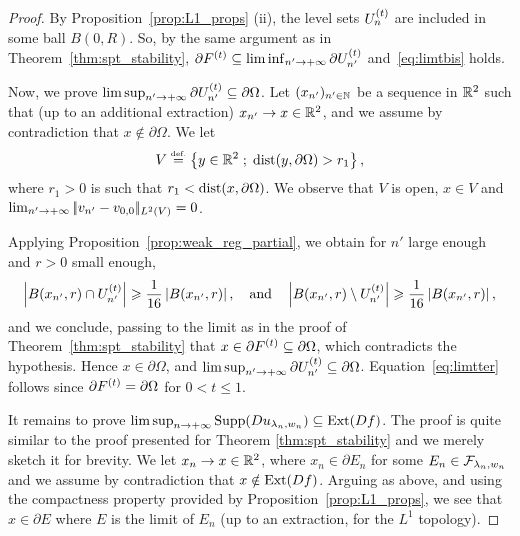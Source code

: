 \begin{proof}
  
  By Proposition~\ref{prop:L1_props} (ii), the level sets $U_n^{(t)}$ are included in some ball $B(0,R)$. So, by the same argument as in Theorem~\ref{thm:spt_stability}, $\partial F^{(t)}\subseteq\liminf_{n'\to+\infty} \partial U_{n'}^{(t)}$ and~\eqref{eq:limtbis} holds.

  Now, we prove $\limsup_{n'\to+\infty} \partial U_{n'}^{(t)}\subseteq \partial \Omega$. Let $(x_{n'})_{n'\in\mathbb{N}}$ be a sequence in $\mathbb{R}^2$ such that (up to an additional extraction) $x_{n'}\to x\in \mathbb{R}^2$, and we assume by contradiction that $x\notin  \partial \Omega$. We let 
  \begin{equation*}
    V\stackrel{\mbox{\upshape\tiny def.}}{=} \left\{ y\in \mathbb{R}^2 \;;\; \mathrm{dist}(y,\partial \Omega)>r_1 \right\},
  \end{equation*}
  where $r_1>0$ is such that $r_1<\mathrm{dist}(x,\partial \Omega)$. We observe that $V$ is open, $x\in V$ and $\lim_{n'\to+\infty} |\!| v_{n'}-v_{0,0} |\!|_{L^2(V)} = 0$.

  Applying Proposition~\ref{prop:weak_reg_partial}, we obtain for $n'$ large enough and $r>0$ small enough, 
\begin{equation*}
  \left| B(x_{n'},r)\cap U_{n'}^{(t)} \right|\geqslant \frac{1}{16}\left| B(x_{n'},r) \right|,\quad \text{and} \quad \left| B(x_{n'},r)\setminus U_{n'}^{(t)} \right| \geqslant \frac{1}{16}\left| B(x_{n'},r) \right|,
\end{equation*}
and we conclude, passing to the limit as in the proof of Theorem~\ref{thm:spt_stability} that $x\in \partial F^{(t)}\subseteq \partial \Omega$, which contradicts the hypothesis. Hence $x\in\partial\Omega$, and $\limsup_{n'\to+\infty} \partial U_{n'}^{(t)}\subseteq \partial \Omega$. Equation~\eqref{eq:limtter} follows since $\partial F^{(t)}=\partial \Omega$ for $0<t\leq 1$.


It remains to prove $ \limsup_{n\to+\infty} \operatorname{Supp}(Du_{\lambda_n,w_n})\subseteq \operatorname{Ext}(Df)$. The proof is quite similar to the proof presented for Theorem \ref{thm:spt_stability} and we merely sketch it for brevity.
We let $x_{n}\to x\in \mathbb{R}^2$, where $x_n\in \partial E_n$ for some $E_n\in \mathcal{F}_{\lambda_n,w_n}$ and we assume by contradiction that $x\notin \operatorname{Ext}(Df)$. Arguing as  above, and using the compactness property provided by Proposition~\ref{prop:L1_props}, we see that $x\in \partial E$ where $E$ is the limit of $E_n$ (up to an extraction, for the $L^1$ topology).


\end{proof}
